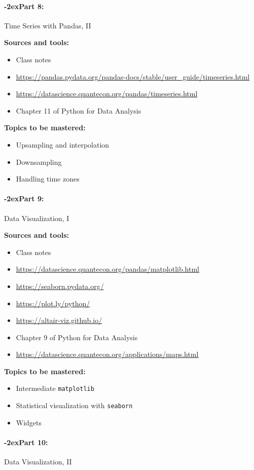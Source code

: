 \documentclass[11pt]{article}
\newcommand{\module}[1]{%
    \paragraph*{\kern-2ex\quad #1:}
  }
\begin{document}
  \module{Part 8} Time Series with Pandas, II

  \bigskip

  {\bf Sources and tools:}
  \begin{itemize}
    \item Class notes
    \item \url{https://pandas.pydata.org/pandas-docs/stable/user_guide/timeseries.html}
    \item \url{https://datascience.quantecon.org/pandas/timeseries.html}
    \item Chapter 11 of Python for Data Analysis
  \end{itemize}

  {\bf Topics to be mastered:}
  \begin{itemize}
    \item Upsampling and interpolation
    \item Downsampling
    \item Handling time zones
  \end{itemize}

  \module{Part 9} Data Visualization, I

  \bigskip

  {\bf Sources and tools:}
  \begin{itemize}
    \item Class notes
    \item \url{https://datascience.quantecon.org/pandas/matplotlib.html}
    \item \url{https://seaborn.pydata.org/}
    \item \url{https://plot.ly/python/}
    \item \url{https://altair-viz.github.io/}
    \item Chapter 9 of Python for Data Analysis
    \item \url{https://datascience.quantecon.org/applications/maps.html}
  \end{itemize}

  {\bf Topics to be mastered:}
  \begin{itemize}
    \item Intermediate \texttt{matplotlib}
    \item Statistical visualization with \texttt{seaborn}
    \item Widgets
  \end{itemize}

  \module{Part 10} Data Visualization, II

  \bigskip
\end{document}
